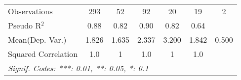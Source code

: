 \begin{tabular}{lcccccc}
   Observations                                               & 293       & 52            & 92             & 20           & 19           & 2\\  
   Pseudo R$^2$                                               & 0.88      & 0.82          & 0.90           & 0.82         & 0.64         & \\  
Mean(Dep. Var.) & 1.826 & 1.635 & 2.337 & 3.200 & 1.842 & 0.500 \\
   Squared Correlation                                        & 1.0       & 1             & 1.0            & 1            & 1.0          & \\  
   \midrule \midrule
   \multicolumn{7}{l}{\emph{Signif. Codes: ***: 0.01, **: 0.05, *: 0.1}}\\
\end{tabular}
\par\endgroup
